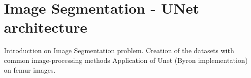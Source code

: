\documentclass{standalone}
\begin{document}
\section[UNet]{Image Segmentation - UNet architecture}\label{unet}

Introduction on Image Segmentation problem.
Creation of the datasets with common image-processing methods %
Application of Unet (Byron implementation) on femur images. %
\end{document}
